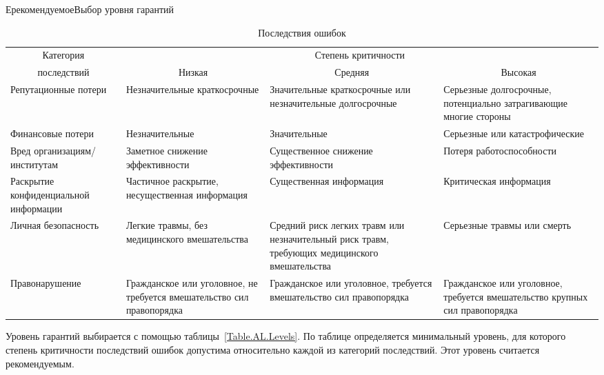\begin{appendix}{Е}{рекомендуемое}{Выбор уровня гарантий}
\begin{table}[hbt]
\caption{Последствия ошибок}\label{Table.AL.Impact}
{\small
\begin{tabular}{|p{3.3cm}|p{4cm}|p{4cm}|p{4cm}|}
\hline
\multicolumn{1}{|c|}{Категория} & \multicolumn{3}{c|}{Степень критичности}\\
\cline{2-4}
\multicolumn{1}{|c|}{последствий} & \multicolumn{1}{c|}{Низкая} 
& \multicolumn{1}{c|}{Средняя} 
& \multicolumn{1}{c|}{Высокая}\\
\hline
\hline
Репутационные потери & 
Незначительные краткосрочные & 
Значительные краткосрочные или незначительные долгосрочные &  
Серьезные долгосрочные, потенциально затрагивающие многие стороны\\
%
\hline
Финансовые потери & 
Незначительные &
Значительные &
Серьезные или катастрофические\\
%
\hline
Вред организациям/институтам & 
Заметное снижение эффективности & 
Существенное снижение эффективности & 
Потеря работоспособности\\ 
%
\hline
Раскрытие конфиденциальной информации &
Частичное раскрытие, несущественная информация &
Существенная информация &
Критическая информация\\
%
\hline
Личная безопасность &
Легкие травмы, без медицинского вмешательства &
Средний риск легких травм или незначительный риск травм, требующих 
медицинского вмешательства &
Серьезные травмы или смерть\\
%
\hline
Правонарушение & 
Гражданское или уголовное, не требуется вмешательство сил правопорядка &
Гражданское или уголовное, требуется вмешательство сил правопорядка &
Гражданское или уголовное, требуется вмешательство крупных сил правопорядка\\
\hline
\end{tabular}
}
\end{table}

\label{AL.Levels}

Уровень гарантий выбирается с помощью таблицы~\ref{Table.AL.Levels}.
%
По таблице определяется минимальный уровень, для которого степень критичности
последствий ошибок допустима относительно каждой из категорий последствий.
%
Этот уровень считается рекомендуемым. 


\end{appendix}
